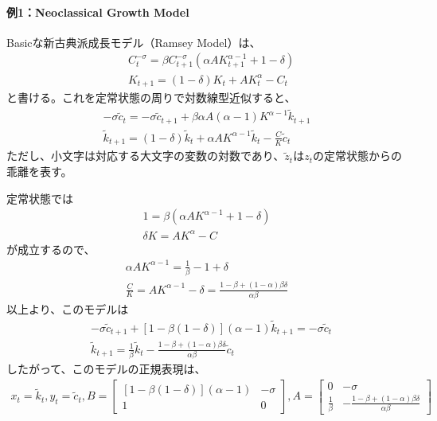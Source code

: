 \documentclass[a4j, dvipdfmx]{jarticle}
\begin{document}
\paragraph{例1：Neoclassical Growth Model}
Basicな新古典派成長モデル（Ramsey Model）は、
\begin{align}
&C_t^{-\sigma} = \beta C_{t+1}^{-\sigma} (\alpha A K_{t+1}^{\alpha-1} + 1 -\delta)\\
&K_{t+1} = (1-\delta) K_t + A K_t^\alpha - C_t
\end{align}
と書ける。これを定常状態の周りで対数線型近似すると、
\begin{align}
-\sigma \tilde c_t = -\sigma  \tilde c_{t+1} + \beta \alpha A (\alpha -1) K^{\alpha -1} \tilde k_{t+1}\\
\tilde k_{t+1} = (1-\delta) \tilde k_t + \alpha A K^{\alpha -1} \tilde k_t - \frac{C}{K} \tilde c_t
\end{align}
ただし、小文字は対応する大文字の変数の対数であり、$\tilde z_t$は$z_t$の定常状態からの乖離を表す。

定常状態では
\begin{align}
1 = \beta (\alpha A K^{\alpha -1} + 1 - \delta)\\
\delta K = AK^\alpha - C
\end{align}
が成立するので、
\begin{align}
\alpha A K^{\alpha -1} = \frac{1}{\beta} - 1 + \delta \\
\frac{C}{K} = AK^{\alpha -1} -\delta = \frac{1-\beta + (1-\alpha)\beta\delta}{\alpha\beta}
\end{align}
以上より、このモデルは
\begin{align}
&-\sigma \tilde c_{t+1} + \left[1 - \beta(1 - \delta)\right] (\alpha - 1) \tilde k_{t+1} = -\sigma \tilde c_t\\
&\tilde k_{t+1} = \frac{1}{\beta} \tilde k_t - \frac{1-\beta + (1-\alpha)\beta\delta}{\alpha\beta} \tilde c_t
\end{align}
したがって、このモデルの正規表現は、
\begin{align}
x_t = \tilde k_t, y_t = \tilde c_t, B = \begin{bmatrix}[1-\beta(1-\delta)](\alpha-1) & -\sigma \\ 1 & 0\end{bmatrix}, A = \begin{bmatrix} 0 & -\sigma \\ \frac{1}{\beta} & - \frac{1-\beta + (1-\alpha)\beta\delta}{\alpha\beta}\end{bmatrix}
\end{align}
\end{document}

